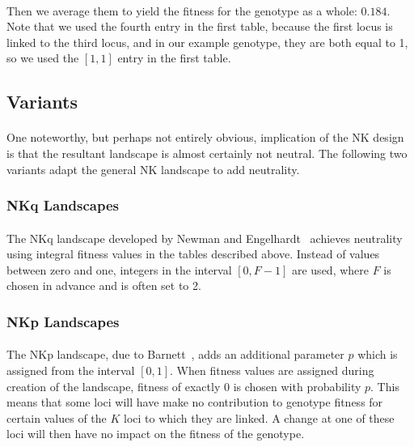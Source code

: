\documentclass[12pt,letterpaper,titlepage]{article}
\begin{document}
\paragraph{}
Then we average them to yield the fitness for the genotype as a whole: $0.184$.
Note that we used the fourth entry in the first table, because the first locus
is linked to the third locus, and in our example genotype, they are both equal
to 1, so we used the $\left[1, 1\right]$ entry in the first table.

\subsection{Variants}

\paragraph{}
One noteworthy, but perhaps not entirely obvious, implication of the NK design
is that the resultant landscape is almost certainly not neutral. The following
two variants adapt the general NK landscape to add neutrality.

\subsubsection{NKq Landscapes}

\paragraph{}
The NKq landscape developed by Newman and Engelhardt~\cite{Newman1998} achieves
neutrality using integral fitness values in the tables described above. Instead
of values between zero and one, integers in the interval $\left[0,F-1\right]$
are used, where $F$ is chosen in advance and is often set to 2.

\subsubsection{NKp Landscapes}

\paragraph{}
The NKp landscape, due to Barnett~\cite{Barnett1998}, adds an additional
parameter $p$ which is assigned from the interval $\left[0,1\right]$. When
fitness values are assigned during creation of the landscape, fitness of
exactly 0 is chosen with probability $p$. This means that some loci will have
make no contribution to genotype fitness for certain values of the $K$ loci to
which they are linked. A change at one of these loci will then have no impact
on the fitness of the genotype.
\end{document}
